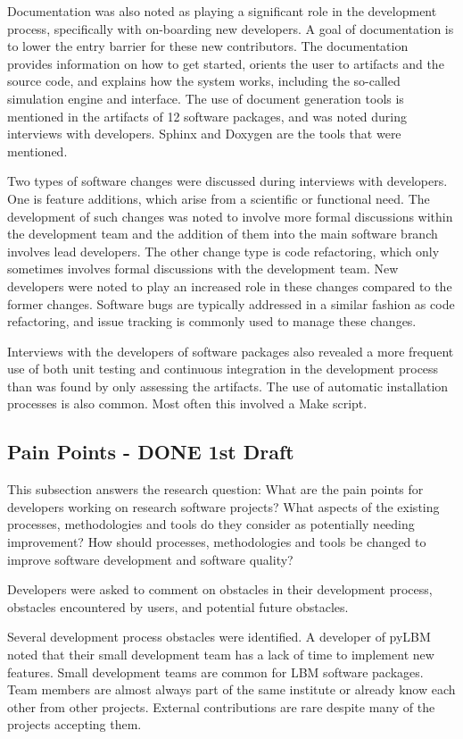 \documentclass[12pt, notitlepage]{article}
\begin{document}
Documentation was also noted as playing a significant role in the development process, specifically with on-boarding new developers. A goal of documentation is to lower the entry barrier for these new contributors. The documentation provides information on how to get started, orients the user to artifacts and the source code, and explains how the system works, including the so-called simulation engine and interface. The use of document generation tools is mentioned in the artifacts of 12 software packages, and was noted during interviews with developers. Sphinx and Doxygen are the tools that were mentioned. 

Two types of software changes were discussed during interviews with developers. One is feature additions, which arise from a scientific or functional need. The development of such changes was noted to involve more formal discussions within the development team and the addition of them into the main software branch involves lead developers. The other change type is code refactoring, which only sometimes involves formal discussions with the development team. New developers were noted to play an increased role in these changes compared to the former changes. Software bugs are typically addressed in a similar fashion as code refactoring, and issue tracking is commonly used to manage these changes. 

Interviews with the developers of software packages also revealed a more frequent use of both unit testing and continuous integration in the development process than was found by only assessing the artifacts. The use of automatic installation processes is also common. Most often this involved a Make script.


\subsection{Pain Points - DONE 1st Draft}\label{painpoints}

This subsection answers the research question: What are the pain points for developers working on research software projects? What aspects of the existing processes, methodologies and tools do they consider as potentially needing improvement? How should processes, methodologies and tools be changed to improve software development and software quality?

Developers were asked to comment on obstacles in their development process, obstacles encountered by users, and potential future obstacles. 

Several development process obstacles were identified. A developer of pyLBM noted that their small development team has a lack of time to implement new features. Small development teams are common for LBM software packages. Team members are almost always part of the same institute or already know each other from other projects. External contributions are rare despite many of the projects accepting them.
\end{document}

